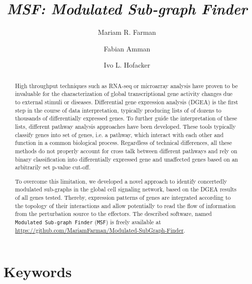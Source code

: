 \documentclass[10pt,a4paper,twocolumn]{article}
\begin{document}
\title{\textit{MSF: Modulated Sub-graph Finder} }

\author[1]{Mariam R. Farman}
\author[1,2]{Fabian Amman}
\author[1]{Ivo L. Hofacker}



\maketitle
\thispagestyle{fancy}

\begin{abstract}

High throughput techniques such as RNA-seq or microarray analysis have
proven to be invaluable for the characterization of global transcriptional
gene activity changes due to external stimuli or diseases. Differential
gene expression analysis (DGEA) is the first step in the course of data
interpretation, typically producing lists of of dozens to thousands of
differentially expressed genes. To further guide the interpretation of
these lists, different pathway analysis approaches have been
developed. These tools typically classify genes into set of genes, i.e. a
pathway, which interact with each other and function in a common biological
process. Regardless of technical differences, all these methods do not
properly account for cross talk between different pathways and rely on
binary classification into differentially expressed gene and unaffected
genes based on an arbitrarily set p-value cut-off.

To overcome this limitation, we developed a novel approach to identify
concertedly modulated sub-graphs in the global cell signaling network,
based on the DGEA results of all genes tested. Thereby, expression
patterns of genes are integrated according to the topology of their
interactions and allow potentially to read the flow of information
from the perturbation source to the effectors. The described software,
named \texttt{Modulated Sub-graph Finder} (\texttt{MSF}) is freely available at
\url{https://github.com/MariamFarman/Modulated-SubGraph-Finder}.

\end{abstract}

\section*{Keywords}
\end{document}
